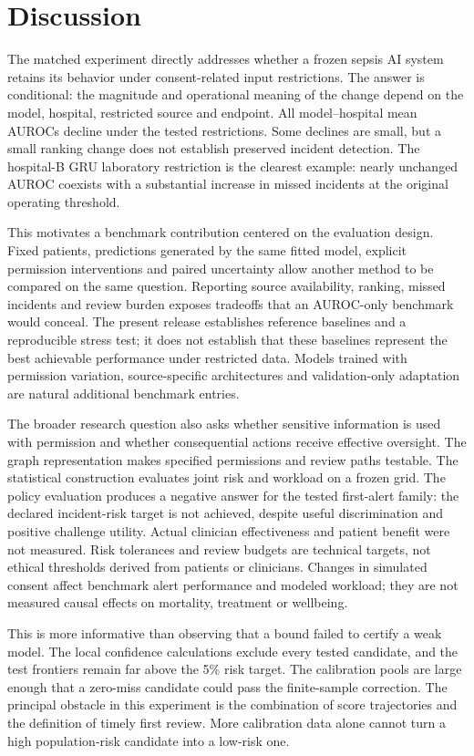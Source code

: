 \section*{Discussion}

The matched experiment directly addresses whether a frozen sepsis AI system retains its behavior under consent-related input restrictions. The answer is conditional: the magnitude and operational meaning of the change depend on the model, hospital, restricted source and endpoint. All model--hospital mean AUROCs decline under the tested restrictions. Some declines are small, but a small ranking change does not establish preserved incident detection. The hospital-B GRU laboratory restriction is the clearest example: nearly unchanged AUROC coexists with a substantial increase in missed incidents at the original operating threshold.

This motivates a benchmark contribution centered on the evaluation design. Fixed patients, predictions generated by the same fitted model, explicit permission interventions and paired uncertainty allow another method to be compared on the same question. Reporting source availability, ranking, missed incidents and review burden exposes tradeoffs that an AUROC-only benchmark would conceal. The present release establishes reference baselines and a reproducible stress test; it does not establish that these baselines represent the best achievable performance under restricted data. Models trained with permission variation, source-specific architectures and validation-only adaptation are natural additional benchmark entries.

The broader research question also asks whether sensitive information is used with permission and whether consequential actions receive effective oversight. The graph representation makes specified permissions and review paths testable. The statistical construction evaluates joint risk and workload on a frozen grid. The policy evaluation produces a negative answer for the tested first-alert family: the declared incident-risk target is not achieved, despite useful discrimination and positive challenge utility. Actual clinician effectiveness and patient benefit were not measured. Risk tolerances and review budgets are technical targets, not ethical thresholds derived from patients or clinicians. Changes in simulated consent affect benchmark alert performance and modeled workload; they are not measured causal effects on mortality, treatment or wellbeing.

This is more informative than observing that a bound failed to certify a weak model. The local confidence calculations exclude every tested candidate, and the test frontiers remain far above the 5\% risk target. The calibration pools are large enough that a zero-miss candidate could pass the finite-sample correction. The principal obstacle in this experiment is the combination of score trajectories and the definition of timely first review. More calibration data alone cannot turn a high population-risk candidate into a low-risk one.


